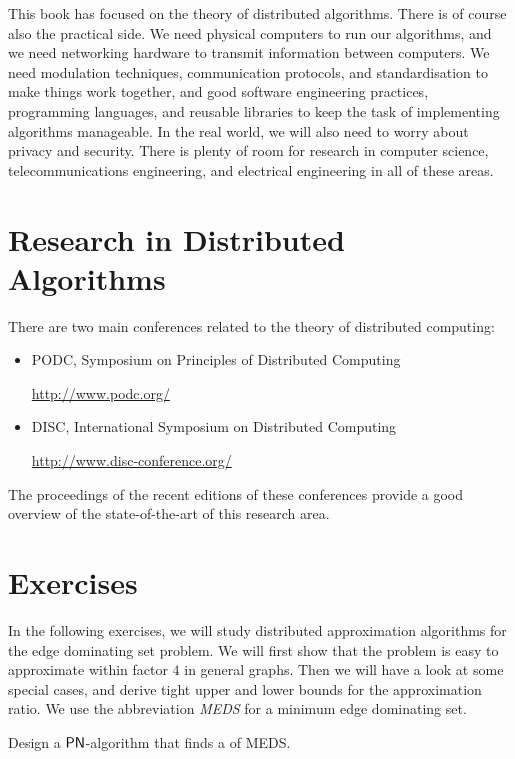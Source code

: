 This book has focused on the theory of distributed algorithms. There is of course also the practical side. We need physical computers to run our algorithms, and we need networking hardware to transmit information between computers. We need modulation techniques, communication protocols, and standardisation to make things work together, and good software engineering practices, programming languages, and reusable libraries to keep the task of implementing algorithms manageable. In the real world, we will also need to worry about privacy and security. There is plenty of room for research in computer science, telecommunications engineering, and electrical engineering in all of these areas.


\section{Research in Distributed Algorithms}

There are two main conferences related to the theory of distributed computing:
\begin{itemize}
    \item PODC, Symposium on Principles of Distributed Computing

    \url{http://www.podc.org/}
    \item DISC, International Symposium on Distributed Computing

    \url{http://www.disc-conference.org/}
\end{itemize}
The proceedings of the recent editions of these conferences provide a good overview of the state-of-the-art of this research area.


\section{Exercises}

In the following exercises, we will study distributed approximation algorithms for the edge dominating set problem. We will first show that the problem is easy to approximate within factor $4$ in general graphs. Then we will have a look at some special cases, and derive tight upper and lower bounds for the approximation ratio. We use the abbreviation \emph{MEDS} for a minimum edge dominating set.

\begin{ex}\label{ex:edsfirst}
    Design a $\textup{\sffamily PN}$-algorithm that finds a  of MEDS.
    
\end{ex}

